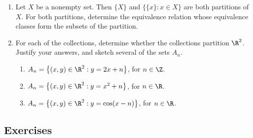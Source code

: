 \begin{enumerate}\renewcommand{\labelenumi}{\thesubsection.\theenumi}
\item Let $X$ be a nonempty set. Then $\{X\}$ and $\{\{x\} : x \in X\}$ are both partitions of $X$. For both partitions, determine the equivalence relation whose equivalence classes form the subsets of the partition.

\item For each of the collections, determine whether the collections partition $\R^2$. Justify your answers, and sketch several of the sets $A_n$.
	\begin{enumerate}
		\item $A_n=\big\{(x,y)\in\R^2:y=2x+n\big\}$, for $n \in \Z$.
	  \item $A_n=\big\{(x,y)\in\R^2:y=x^2+n\big\}$, for $n \in \R$.
	  \item $A_n=\big\{(x,y)\in\R^2: y=\cos(x-n)\big\}$, for $n \in \R$.
	\end{enumerate}
\end{enumerate}


\subsection*{Exercises}

